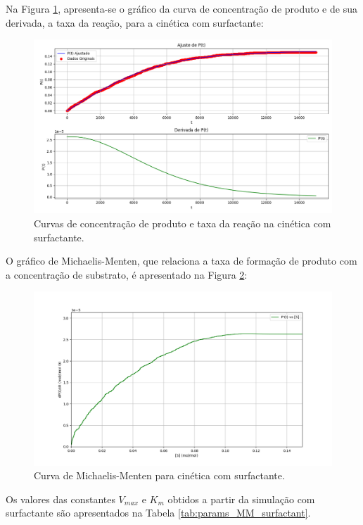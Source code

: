 \documentclass[12pt,oneside]{report}
\begin{document}
Na Figura \ref{fig:MM_surf_rate}, apresenta-se o gráfico da curva de concentração de produto e de sua derivada, a taxa da reação, para a cinética com surfactante:

\begin{figure}[H]
    \centering
    \includegraphics[width=1\textwidth]{img/MM_surf_rate.png}
    \caption{\small Curvas de concentração de produto e taxa da reação na cinética com surfactante.}
    \label{fig:MM_surf_rate}
\end{figure}

O gráfico de Michaelis-Menten, que relaciona a taxa de formação de produto com a concentração de substrato, é apresentado na Figura \ref{fig:MM_surf_curve}:

\begin{figure}[H]
    \centering
    \includegraphics[width=1\textwidth]{img/MM_surf_curve.png}
    \caption{\small Curva de Michaelis-Menten para cinética com surfactante.}
    \label{fig:MM_surf_curve}
\end{figure}

Os valores das constantes $V_{max}$ e $K_m$ obtidos a partir da simulação com surfactante são apresentados na Tabela \ref{tab:params_MM_surfactant}.
\end{document}
